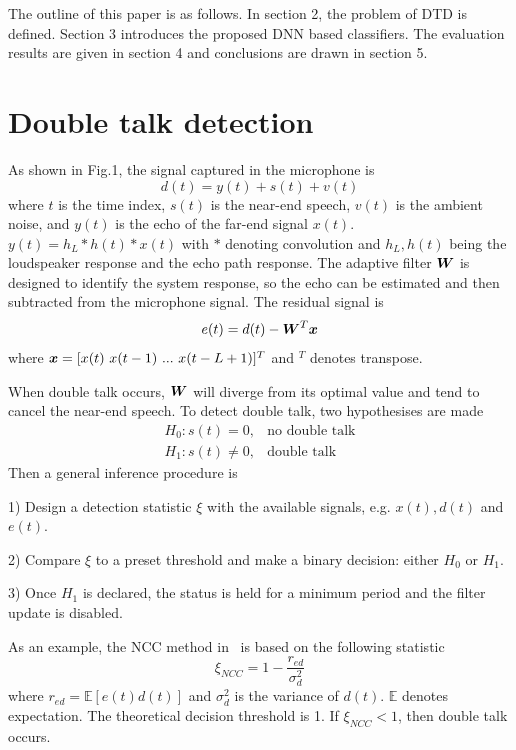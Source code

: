 \documentclass[a4paper]{article}
\begin{document}
The outline of this paper is as follows. In section 2, the problem of DTD is defined. Section 3 introduces the proposed DNN based classifiers. The evaluation results are given in section 4 and conclusions are drawn in section 5.


\section{Double talk detection}

As shown in Fig.1, the signal captured in the microphone is
\begin{equation}\label{eq:micsig}
  d(t)=y(t)+s(t)+v(t)
\end{equation}
where $t$ is the time index, $s(t)$ is the near-end speech, $v(t)$ is the ambient noise, and $y(t)$ is the echo of the far-end signal $x(t)$. $y(t)=h_L*h(t)*x(t)$ with $*$ denoting convolution and $h_L, h(t)$ being the loudspeaker response and the echo path response. The adaptive filter $\bm{{W}}$ is designed to identify the system response, so the echo can be estimated and then subtracted from the microphone signal. The residual signal is
\begin{equation}\label{eq:err}
  e(t) = d(t) - \bm{{W}}^T\bm{{x}}
\end{equation}
where $\bm{{x}}=[x(t)~x(t-1)~...~x(t-L+1)]^T$ and $^T$ denotes transpose.

When double talk occurs, $\bm{{W}}$ will diverge from its optimal value and tend to cancel the near-end speech. To detect double talk, two hypothesises are made
\begin{eqnarray}
  H_0:  s(t)=0, &\text{no double talk} \\
  H_1:  s(t)\neq 0,& \text{double talk}
\end{eqnarray}
Then a general inference procedure is

1) Design a detection statistic $\xi$ with the available signals, e.g. $x(t),d(t)$ and $e(t)$.

2) Compare $\xi$ to a preset threshold and make a binary decision: either $H_0$ or $H_1$.

3) Once $H_1$ is declared, the status is held for a minimum period and the filter update is disabled.

As an example, the NCC method in~\cite{iqbal2007normalized} is based on the following statistic
\begin{equation}\label{eq:ncc}
  \xi_{NCC}=1-\frac{r_{ed}}{\sigma^2_d}
\end{equation}
where $r_{ed}=\mathbb{E}[e(t)d(t)]$ and $\sigma^2_d$ is the variance of $d(t)$. $\mathbb{E}$ denotes expectation. The theoretical decision threshold is 1. If $\xi_{NCC}<1$, then double talk occurs.
\end{document}

